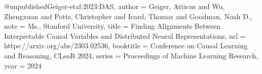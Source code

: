 @unpublished{Geiger-etal:2023:DAS,
	author = {Geiger, Atticus and Wu, Zhengxuan and Potts, Christopher and Icard, Thomas and Goodman, Noah D.},
	note = {Ms., Stanford University},
	title = {Finding Alignments Between Interpretable Causal Variables and Distributed Neural Representations},
	url = {https://arxiv.org/abs/2303.02536},
  booktitle    = {Conference on Causal Learning and Reasoning, CLeaR 2024},
  series       = {Proceedings of Machine Learning Research},
	year = {2024}}
